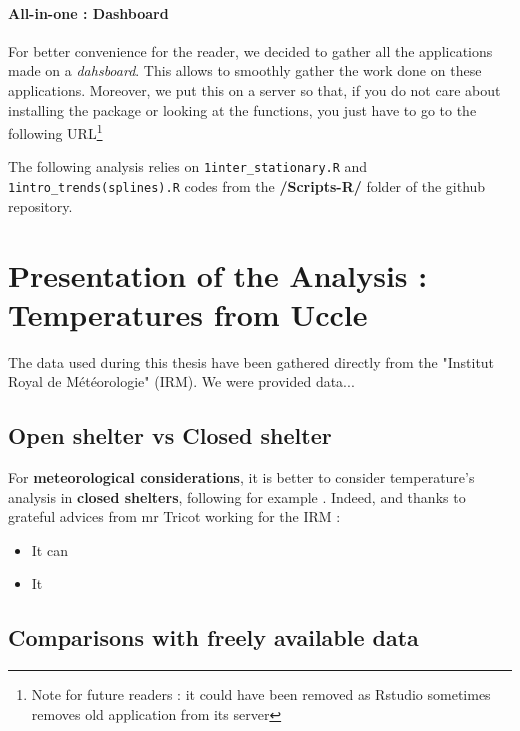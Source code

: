  \vspace{-0.22cm}
\paragraph*{All-in-one : Dashboard} For better convenience for the reader, we decided to gather all the applications made on a \emph{dahsboard}. This allows to smoothly gather the work done on these applications. Moreover, we put this on a server so that, if you do not care about installing the package or looking at the functions, you just have to go to the following URL\footnote{Note for future readers : it could have been removed as Rstudio sometimes removes old application from its server}


The following analysis relies on \texttt{1inter\_stationary.R} and \texttt{1intro\_trends(splines).R} codes from the \textbf{/Scripts-R/} folder of the github repository.

\section{Presentation of the Analysis : Temperatures from Uccle}

The data used during this thesis have been gathered directly from the "Institut Royal de Météorologie" (IRM). We were provided data...


\subsection{Open shelter vs Closed shelter}

For\textbf{ meteorological considerations}, it is better to consider temperature's analysis in \textbf{closed shelters}, following for example \citet{lindsey_use_1956}. Indeed, and thanks to grateful advices from mr Tricot working for the IRM : 
\begin{itemize}
	\item It can
	\item It
\end{itemize}


\subsection{Comparisons with freely available data} 

